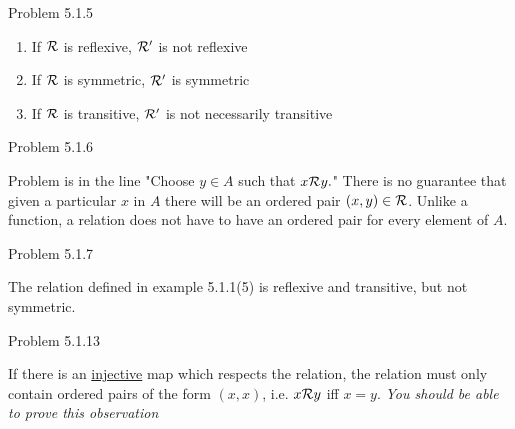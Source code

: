 \documentclass{article}
\theoremstyle{definition}
\begin{document}
	\vspace{1cm}



	\noindent Problem 5.1.5  \vspace{0.3cm}

	\begin{enumerate}
		\item If ${\cal R}$ is reflexive, ${\cal R'}$ is not reflexive
		\item If ${\cal R}$ is symmetric, ${\cal R'}$ is symmetric
		\item If ${\cal R}$ is transitive, ${\cal R'}$ is not necessarily
		transitive
	\end{enumerate}

	\vspace{1cm}



	\noindent Problem 5.1.6  \vspace{0.3cm}

	Problem is in the line "Choose $y\in A$ such that $x{\cal R}y.$"
	There is no guarantee that given a particular $x$ in $A$ there will
	be an ordered pair $(x,y)\in {\cal R}$. Unlike a function, a
	relation does not have to have an ordered pair for every element of
	$A$.

	\vspace{1cm}



	\noindent Problem 5.1.7  \vspace{0.3cm}

	The relation defined in example 5.1.1(5) is reflexive and
	transitive, but not symmetric.


	\vspace{1cm}


	\newpage


	\noindent Problem 5.1.13  \vspace{0.3cm}

	If there is an \underline{injective} map which respects the
	relation, the relation must only contain ordered pairs of the form
	$(x,x)$, i.e. $x{\cal R}y$ iff $x=y$.  {\it You should be able to
	prove this observation}

	\vspace{1cm}


\end{document}
